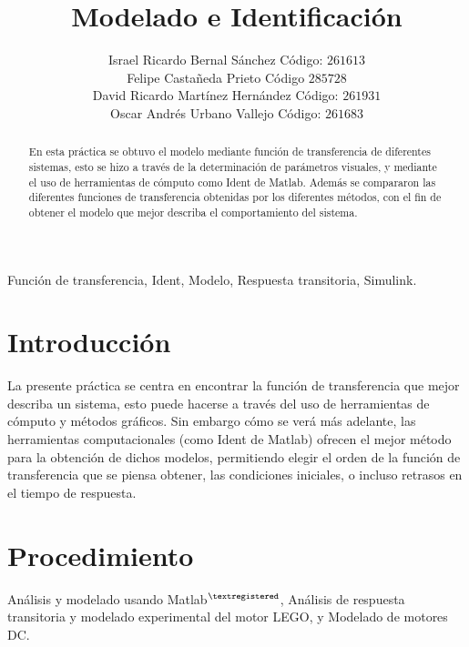 \documentclass[twocolumn]{IEEEtran}
\begin{document}
\title{Modelado e Identificación}
\author{Israel Ricardo Bernal Sánchez Código: $261613$\\
	Felipe Castañeda Prieto Código $285728$\\
	David Ricardo Martínez Hernández Código: $261931$\\
	Oscar Andrés Urbano Vallejo Código: $261683$}
\maketitle
{}
\begin{abstract}
 En esta práctica se obtuvo el modelo mediante  función de transferencia de diferentes sistemas, esto se hizo a través de la determinación de parámetros visuales, y mediante el uso de herramientas de cómputo como Ident de Matlab. Además se compararon las diferentes funciones de transferencia obtenidas por los diferentes métodos, con el fin de obtener el modelo que mejor describa el comportamiento del sistema.
\end{abstract}

\begin{keywords}
 Función de transferencia, Ident, Modelo, Respuesta transitoria, Simulink.
\end{keywords}

\section{Introducción}
\noindent
La presente práctica se centra en encontrar la función de transferencia que mejor describa un sistema, esto puede hacerse a través del uso de herramientas de cómputo y métodos gráficos. Sin embargo cómo se verá más adelante, las herramientas computacionales (como Ident de Matlab) ofrecen el mejor método para la obtención de dichos modelos, permitiendo elegir el orden de la función de transferencia que se piensa obtener, las condiciones iniciales, o incluso retrasos en el tiempo de respuesta.

\section{Procedimiento}
\noindent
Análisis y modelado usando Matlab$^{\textregistered}$, Análisis de respuesta transitoria y modelado experimental del motor LEGO, y Modelado de motores DC.
\end{document}
